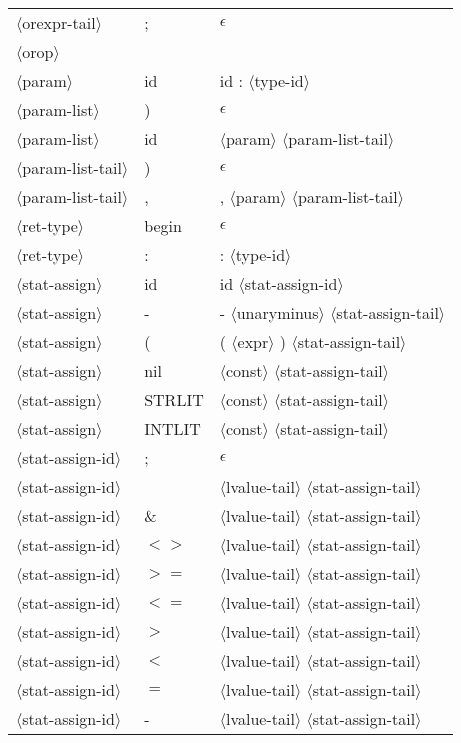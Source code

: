 \documentclass[11pt, fleqn]{article}
\newcommand{\atag}[1]{$\langle$#1$\rangle$}
\begin{document}
\begin{longtable}{l|l|l}
\atag{orexpr-tail}				&	 ;		&	$\epsilon$	\\
\atag{orop} 						&	\textbar		&	\textbar	\\
\atag{param}						&	id		&	id : \atag{type-id}		\\
\atag{param-list}				&	)		&	$\epsilon$	\\
\atag{param-list}				&	id		&	\atag{param}	 \atag{param-list-tail}	\\
\atag{param-list-tail}			&	)		&	$\epsilon$	\\
\atag{param-list-tail}			&	,		&	, \atag{param} \atag{param-list-tail}	\\
\atag{ret-type}					&	begin	&	$\epsilon$	\\
\atag{ret-type}					&	:		&	: \atag{type-id}		\\
\atag{stat-assign}				&	id		&	id \atag{stat-assign-id}		\\
\atag{stat-assign}				&	-		&	- \atag{unaryminus} \atag{stat-assign-tail}		\\
\atag{stat-assign}				&	(		&	( \atag{expr} ) \atag{stat-assign-tail}		\\
\atag{stat-assign}				&	nil		&	\atag{const}	 \atag{stat-assign-tail}		\\
\atag{stat-assign}				&	STRLIT		&	\atag{const}	 \atag{stat-assign-tail}		\\
\atag{stat-assign}				&	INTLIT		&	\atag{const}	 \atag{stat-assign-tail}		\\
\atag{stat-assign-id}			&	;			&	$\epsilon$			\\
\atag{stat-assign-id}			&	\textbar		&	\atag{lvalue-tail} \atag{stat-assign-tail}			\\
\atag{stat-assign-id}			&	\&			&	\atag{lvalue-tail} \atag{stat-assign-tail}			\\
\atag{stat-assign-id}			&	$<>$			&	\atag{lvalue-tail} \atag{stat-assign-tail}			\\
\atag{stat-assign-id}			&	$>=$			&	\atag{lvalue-tail} \atag{stat-assign-tail}			\\
\atag{stat-assign-id}			&	$<=$			&	\atag{lvalue-tail} \atag{stat-assign-tail}			\\
\atag{stat-assign-id}			&	$>$			&	\atag{lvalue-tail} \atag{stat-assign-tail}			\\
\atag{stat-assign-id}			&	$<$			&	\atag{lvalue-tail} \atag{stat-assign-tail}			\\
\atag{stat-assign-id}			&	$=$			&	\atag{lvalue-tail} \atag{stat-assign-tail}			\\
\atag{stat-assign-id}			&	-			&	\atag{lvalue-tail} \atag{stat-assign-tail}			\\

\end{longtable}
\end{document}
